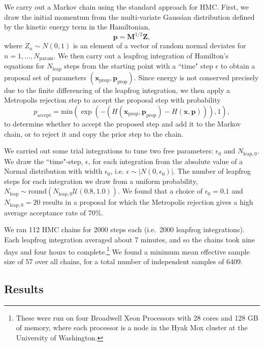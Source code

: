 \documentclass[twocolumn]{aastex63}
\begin{document}
We carry out a Markov chain using the standard approach for HMC. First, we draw the initial momentum from the multi-variate Gaussian distribution defined by the kinetic energy term in the Hamiltonian,
\begin{equation}
    \mathbf{p} = \mathbf{M}^{1/2} \mathbf{Z},
\end{equation}
where $Z_n \sim N(0,1)$ is an element of a vector of random normal deviates for $n=1,...,N_\mathrm{param}$.
We then carry out a leapfrog integration of Hamilton's equations for $N_\mathrm{leap}$ steps from the starting point with a ``time" step $\epsilon$ to obtain a proposal set of parameters $(\mathbf{x}_\mathrm{prop},\mathbf{p}_\mathrm{prop})$.  Since energy is not conserved precisely due to the finite differencing of the leapfrog integration, we then apply a Metropolis rejection step to accept the proposal step with probability
\begin{equation}
    p_\mathrm{accept} = \mathrm{min}(\exp(-(H(\mathbf{x}_\mathrm{prop},\mathbf{p}_\mathrm{prop}) - H(\mathbf{x},\mathbf{p}))),1),
\end{equation}
to determine whether to accept the proposed step and add it to the Markov chain, or to reject it and copy the prior step to the chain.

We carried out some trial integrations to tune two free parameters:  $\epsilon_0$ and $N_{\mathrm{leap},0}$.  We draw the ``time"-step, $\epsilon$, for each integration from the absolute value of a Normal distribution with width $\epsilon_0$, i.e. $\epsilon \sim \vert N(0,\epsilon_0) \vert$.
The number of leapfrog steps for each integration we draw from a uniform probability,
$N_\mathrm{leap} \sim \mathrm{round}(N_{\mathrm{leap},0} \mathcal{U}(0.8,1.0))$.  We found that a choice of $\epsilon_0 = 0.1$
and $N_{\mathrm{leap},0} = 20$ results in a proposal for which the Metropolis rejection gives a high average acceptance rate of 70\%.

We ran 112 HMC chains for 2000 steps each (i.e.\ 2000 leapfrog integrations).   Each leapfrog integration averaged about 7 minutes, and so the chains took nine
days and four hours to complete.\footnote{These were run on four Broadwell Xeon Processors with 28 cores and  128 GB of memory, where each processor is a node in the Hyak Mox cluster at the University of Washington.}
We found a minimum mean effective sample size of 57 over all chains, for a
total number of independent samples of 6409.

\subsection{Results}
\end{document}
